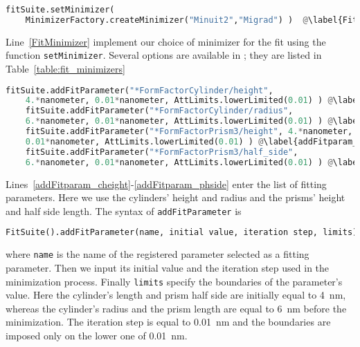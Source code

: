 \begin{lstlisting}[language=python, style=eclipseboxed,
  name=exfit,nolol]
    fitSuite.setMinimizer(
    MinimizerFactory.createMinimizer("Minuit2","Migrad") )  @\label{FitMinimizer}@
\end{lstlisting}

Line~\ref{FitMinimizer} implement our choice of minimizer for the
fit using the function \texttt{setMinimizer}. Several options are available in \BornAgain; they are listed in
Table~\ref{table:fit_minimizers}


\begin{lstlisting}[language=python, style=eclipseboxed,
  name=exfit,nolol]
    fitSuite.addFitParameter("*FormFactorCylinder/height",
    4.*nanometer, 0.01*nanometer, AttLimits.lowerLimited(0.01) ) @\label{addFitparam_cheight}@
    fitSuite.addFitParameter("*FormFactorCylinder/radius",
    6.*nanometer, 0.01*nanometer, AttLimits.lowerLimited(0.01) ) @\label{addFitparam_cradius}@
    fitSuite.addFitParameter("*FormFactorPrism3/height", 4.*nanometer,
    0.01*nanometer, AttLimits.lowerLimited(0.01) ) @\label{addFitparam_pheight}@
    fitSuite.addFitParameter("*FormFactorPrism3/half_side",
    6.*nanometer, 0.01*nanometer, AttLimits.lowerLimited(0.01) ) @\label{addFitparam_phside}@
\end{lstlisting}

Lines~\ref{addFitparam_cheight}-\ref{addFitparam_phside} enter the
list of fitting parameters. Here we use the cylinders' height and
radius and the prisms' height and half side length. The syntax of
\texttt{addFitParameter} is
\begin{lstlisting}[language=python, style=eclipse,numbers=none]
FitSuite().addFitParameter(name, initial value, iteration step, limits)
\end{lstlisting}
where \texttt{name} is the name of the registered parameter selected
as a fitting parameter. Then we input its initial
value and the iteration step used in the minimization process. Finally
\texttt{limits} specify the boundaries of the parameter's value. Here
the cylinder's length and prism half side are initially equal to 4~nm,
whereas the cylinder's radius and the prism length are equal to 6~nm before the minimization. The
iteration step is equal to 0.01~nm and the boundaries are imposed only
on the lower one of 0.01~nm.\\


